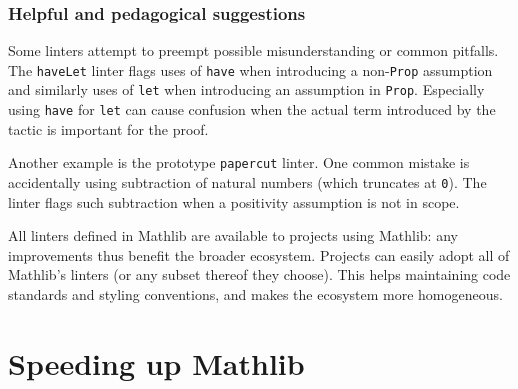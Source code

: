\documentclass[runningheads]{llncs}
\def\mathlib{Mathlib\xspace}
\newcommand{\lean}[1]{\texttt{#1}}
\newcommand{\hide}[1]{}
\begin{document}
\subsubsection{Helpful and pedagogical suggestions}

Some linters attempt to preempt possible misunderstanding or common pitfalls.
The \lean{haveLet} linter flags uses of \lean{have} when introducing a non-\lean{Prop} assumption and
similarly uses of \lean{let} when introducing an assumption in \lean{Prop}.
Especially using \lean{have} for \lean{let} can cause confusion when the actual term introduced by the tactic is important for the proof.

Another example is the prototype \lean{papercut} linter.
One common mistake is accidentally using subtraction of natural numbers (which truncates at \lean{0}).
The linter flags such subtraction when a positivity assumption is not in scope.

All linters defined in \mathlib are available to projects using \mathlib: any improvements thus benefit the broader ecosystem.
Projects can easily adopt all of \mathlib's linters (or any subset thereof they choose). This helps maintaining code standards and styling conventions, and makes the ecosystem more homogeneous.

\hide{\subsubsection{Prototypes}
\begin{itemize}
\item MetaTest
\item Relative
\end{itemize}}

\section{Speeding up \mathlib}
\label{sec:speed}
\end{document}
